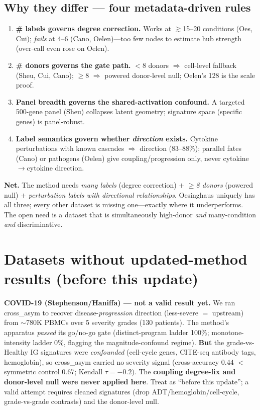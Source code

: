\documentclass[11pt]{article}
\begin{document}
\subsection{Why they differ --- four metadata-driven rules}
\begin{enumerate}
\item \textbf{\# labels governs degree correction.} Works at $\gtrsim$15--20 conditions (Oes, Cui); \emph{fails} at 4--6 (Cano, Oelen)---too few nodes to estimate hub strength (over-call even rose on Oelen).
\item \textbf{\# donors governs the gate path.} $<$8 donors $\Rightarrow$ cell-level fallback (Sheu, Cui, Cano); $\geq$8 $\Rightarrow$ powered donor-level null; Oelen's 128 is the scale proof.
\item \textbf{Panel breadth governs the shared-activation confound.} A targeted 500-gene panel (Sheu) collapses latent geometry; signature space (specific genes) is panel-robust.
\item \textbf{Label semantics govern whether \emph{direction} exists.} Cytokine perturbations with known cascades $\Rightarrow$ direction (83--88\%); parallel fates (Cano) or pathogens (Oelen) give coupling/progression only, never cytokine$\to$cytokine direction.
\end{enumerate}
\textbf{Net.} The method needs \emph{many labels} (degree correction) $+$ \emph{$\geq$8 donors} (powered null) $+$ \emph{perturbation labels with directional relationships}. Oesinghaus uniquely has all three; every other dataset is missing one---exactly where it underperforms. The open need is a dataset that is simultaneously high-donor \emph{and} many-condition \emph{and} discriminative.

\section{Datasets without updated-method results (before this update)}
\textbf{COVID-19 (Stephenson/Haniffa) --- not a valid result yet.} We ran cross\_asym to recover disease-\emph{progression} direction (less-severe $=$ upstream) from $\sim$780K PBMCs over 5 severity grades (130 patients). The method's apparatus \emph{passed} its go/no-go gate (distinct-program ladder 100\%; monotone-intensity ladder 0\%, flagging the magnitude-confound regime). \textbf{But} the grade-vs-Healthy IG signatures were \emph{confounded} (cell-cycle genes, CITE-seq antibody tags, hemoglobin), so cross\_asym carried no severity signal (cross-accuracy 0.44 $<$ symmetric control 0.67; Kendall $\tau=-0.2$). The \textbf{coupling degree-fix and donor-level null were never applied here}. Treat as ``before this update''; a valid attempt requires cleaned signatures (drop ADT/hemoglobin/cell-cycle, grade-vs-grade contrasts) and the donor-level null.
\end{document}
